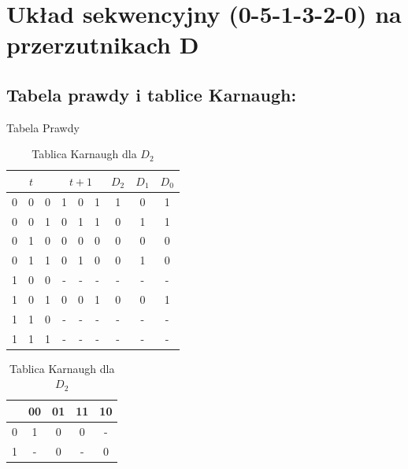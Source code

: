 \documentclass[12pt,a4paper]{article}
\begin{document}
	\section{Układ sekwencyjny (0-5-1-3-2-0) na przerzutnikach D}
		
		\subsection{Tabela prawdy i tablice Karnaugh:}
			
			\begin{table}[H]
				\caption{Tabela Prawdy}
				\vspace{0.2cm}
				\centering
				\begin{tabular}{ccc|ccc|ccc}
					\multicolumn{3}{c|}{$t$}&\multicolumn{3}{c|}{$t+1$}&$D_2$&$D_1$&$D_0$\\\hline
					0&0&0 &1&0&1 &1&0&1\\
					0&0&1 &0&1&1 &0&1&1\\
					0&1&0 &0&0&0 &0&0&0\\
					0&1&1 &0&1&0 &0&1&0\\\hline
					1&0&0 &-&-&- &-&-&-\\
					1&0&1 &0&0&1 &0&0&1\\
					1&1&0 &-&-&- &-&-&-\\
					1&1&1 &-&-&- &-&-&-\\
				\end{tabular}
				\vspace{1cm}
				
				\begin{minipage}{.5\textwidth}
					\caption{Tablica Karnaugh dla $D_2$}
					\vspace{0.2cm}
					\centering
					\begin{tabular}{c|c|c|c|c}
						\backslashbox{$Q_2$}{$Q_1Q_0$}&00&01&11&10\\\hline
						0&	1&0&0&-\\\hline
						1&	-&0&-&0\\
					\end{tabular}
					
					\vspace{0.4cm}
					

\end{minipage}
\end{table}
\end{document}

